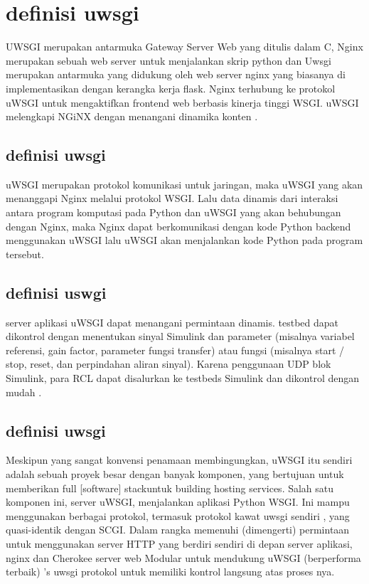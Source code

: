 
\section{definisi uwsgi}
UWSGI merupakan antarmuka Gateway Server Web yang ditulis dalam C, Nginx merupakan sebuah web server untuk
menjalankan skrip python dan Uwsgi merupakan antarmuka yang didukung oleh web server nginx yang biasanya di implementasikan dengan kerangka kerja flask. Nginx terhubung ke protokol uWSGI untuk mengaktifkan frontend web berbasis kinerja tinggi WSGI. uWSGI melengkapi NGiNX dengan menangani dinamika konten \cite{balaji2013sentinel}.

\subsection{definisi uwsgi}
uWSGI merupakan protokol komunikasi untuk jaringan, maka uWSGI yang akan menanggapi Nginx melalui protokol WSGI. Lalu data dinamis dari interaksi antara program komputasi pada Python dan uWSGI yang akan behubungan dengan Nginx, maka Nginx dapat berkomunikasi dengan kode Python backend menggunakan uWSGI lalu uWSGI akan menjalankan kode Python pada program tersebut\cite{hirschbergreal}.

\subsection{definisi uswgi}
server aplikasi uWSGI dapat menangani permintaan dinamis. testbed dapat dikontrol dengan menentukan sinyal Simulink dan parameter (misalnya variabel referensi, gain factor, parameter fungsi transfer) atau fungsi (misalnya start / stop, reset, dan perpindahan aliran sinyal). Karena penggunaan UDP blok Simulink, para RCL dapat disalurkan ke testbeds Simulink dan dikontrol dengan mudah \cite{zumsandedesign}.

\subsection{definisi uwsgi}
Meskipun yang sangat konvensi penamaan membingungkan, uWSGI itu sendiri adalah sebuah proyek besar dengan banyak komponen, yang bertujuan untuk memberikan full [software] stackuntuk building hosting services. Salah satu komponen ini, server uWSGI, menjalankan aplikasi Python WSGI. Ini mampu menggunakan berbagai protokol, termasuk protokol kawat uwsgi sendiri , yang quasi-identik dengan SCGI. Dalam rangka memenuhi (dimengerti) permintaan untuk menggunakan server HTTP yang berdiri sendiri di depan server aplikasi, nginx dan Cherokee server web Modular untuk mendukung uWSGI (berperforma terbaik) 's uwsgi protokol untuk memiliki kontrol langsung atas proses nya\cite{dong2015chemdes}.

